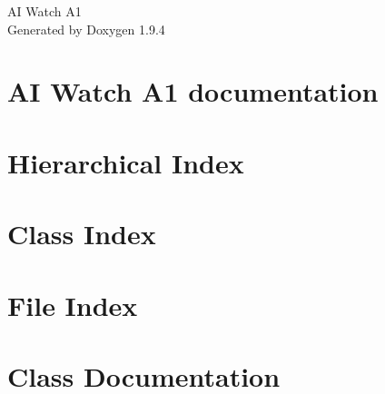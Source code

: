 \documentclass[twoside]{book}
\newcommand{\+}{\discretionary{\mbox{\scriptsize$\hookleftarrow$}}{}{}}
\newcommand{\clearemptydoublepage}{%
    \newpage{\pagestyle{empty}\cleardoublepage}%
  }
\begin{document}
  \raggedbottom
    \hypersetup{pageanchor=false,
                bookmarksnumbered=true,
                pdfencoding=unicode
               }
  \begin{titlepage}
  \vspace*{7cm}
  \begin{center}%
  {\Large AI Watch A1}\\
  \vspace*{1cm}
  {\large Generated by Doxygen 1.9.4}\\
  \end{center}
  \end{titlepage}
  \clearemptydoublepage
  \tableofcontents
  \clearemptydoublepage
  \hypersetup{pageanchor=true}
\chapter{AI Watch A1 documentation}
\label{index}\hypertarget{index}{}
\chapter{Hierarchical Index}

\chapter{Class Index}

\chapter{File Index}

\chapter{Class Documentation}



















\end{document}
